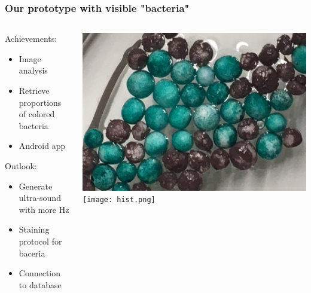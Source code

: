 \documentclass[xcolor=dvipsnames]{beamer}
\begin{document}
	\begin{frame}
      \frametitle{Our prototype with visible "bacteria"}
      \begin{columns}
      \begin{column}{.5\textwidth}
      Achievements:
            \begin{itemize}
            	\item Image analysis 
            	\item Retrieve proportions of colored bacteria
            	\item Android app
            \end{itemize}
            \vspace{\baselineskip}
            Outlook:
                  \begin{itemize}
                  	\item Generate ultra-sound with more Hz 
                  	\item Staining protocol for baceria
                  	\item Connection to database
                  \end{itemize}
      \end{column}
      \begin{column}{.5\textwidth}
      	 \begin{center}
      	  \includegraphics[scale=0.1]{bacteria-mag.jpg}\newline
      	  \vspace{0.5cm}\newline
      	  \texttt{[image: hist.png]}
      	 \end{center}
      \end{column}
      \end{columns}
    \vspace{\baselineskip} 
     
    \end{frame}
    
\end{document}
